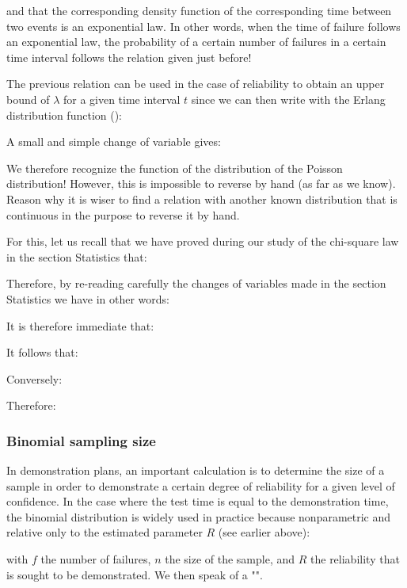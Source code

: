  	and that the corresponding density function of the corresponding time between two events is an exponential law. In other words, when the time of failure follows an exponential law, the probability of a certain number of failures in a certain time interval follows the relation given just before!

	The previous relation can be used in the case of reliability to obtain an upper bound of $\lambda$ for a given time interval $t$ since we can then write with the Erlang distribution function ():
	
	A small and simple change of variable gives:
	
	We therefore recognize the function of the distribution of the Poisson distribution! However, this is impossible to reverse by hand (as far as we know). Reason why it is wiser to find a relation with another known distribution that is continuous in the purpose to reverse it by hand.

	For this, let us recall that we have proved during our study of the chi-square law in the section Statistics that:
	
	Therefore, by re-reading carefully the changes of variables made in the section Statistics we have in other words:
	
 	It is therefore immediate that:
	
	It follows that:
	
	Conversely:
	
	Therefore:
	
	
	\subsubsection{Binomial sampling size}
	In demonstration plans, an important calculation is to determine the size of a sample in order to demonstrate a certain degree of reliability for a given level of confidence. In the case where the test time is equal to the demonstration time, the binomial distribution is widely used in practice because nonparametric and relative only to the estimated parameter $R$ (see earlier above):
	
	with $f$ the number of failures, $n$ the size of the sample, and $R$ the reliability that is sought to be demonstrated. We then speak of a "".
	

